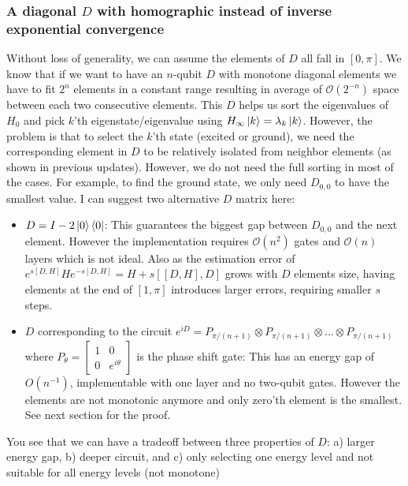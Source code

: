 \documentclass[11pt]{article}
\begin{document}
\subsubsection{A diagonal $D$ with homographic instead of inverse exponential convergence}
\label{sec:homographic-D}
Without loss of generality, we can assume the elements of $D$ all fall in $[0, \pi]$. We know that if we want to have an $n$-qubit $D$ with monotone diagonal elements we have to fit $2^n$ elements in a constant range resulting in average of $\mathcal{O}(2^{-n})$ space between each two consecutive elements. This $D$ helps us sort the eigenvalues of $H_0$ and pick $k$'th eigenstate/eigenvalue using $H_\infty\ket{k} = \lambda_k\ket{k}$. However, the problem is that to select the $k$'th state (excited or ground), we need the corresponding element in $D$ to be relatively isolated from neighbor elements (as shown in previous updates). However, we do not need the full sorting in most of the cases. For example, to find the ground state, we only need $D_{0,0}$ to have the smallest value. I can suggest two alternative $D$ matrix here:
\begin{itemize}
    \item $D = I - 2\ket{0}\bra{0}$: This guarantees the biggest gap between $D_{0,0}$ and the next element. However the implementation requires $\mathcal{O}(n^2)$ gates and $\mathcal{O}(n)$ layers which is not ideal. Also as the estimation error of $e^{s[D, H]}He^{-s[D, H]} = H + s[[D, H], D]$ grows with $D$ elements size, having elements at the end of $[1, \pi]$ introduces larger errors, requiring smaller $s$ steps.
    \item $D$ corresponding to the circuit $e^{iD} = P_{\pi/(n+1)} \otimes P_{\pi/(n+1)} \otimes \dots \otimes P_{\pi/(n+1)}$ where $P_{\theta} = \begin{bmatrix}1 & 0 \\ 0 & e^{i\theta}\end{bmatrix}$ is the phase shift gate: This has an energy gap of $O(n^{-1})$, implementable with one layer and no two-qubit gates. However the elements are not monotonic anymore and only zero'th element is the smallest. See next section for the proof.
\end{itemize}

You see that we can have a tradeoff between three properties of $D$: a) larger energy gap, b) deeper circuit, and c) only selecting one energy level and not suitable for all energy levels (not monotone)
\end{document}
